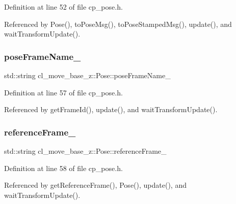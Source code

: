 Definition at line 52 of file cp\+\_\+pose.\+h.



Referenced by Pose(), to\+Pose\+Msg(), to\+Pose\+Stamped\+Msg(), update(), and wait\+Transform\+Update().

\mbox{\label{classcl__move__base__z_1_1Pose_a4f45be8e2fd73e618d815582a4ca8efe}} 
\subsubsection{\texorpdfstring{pose\+Frame\+Name\+\_\+}{poseFrameName\_}}
{\footnotesize\ttfamily std\+::string cl\+\_\+move\+\_\+base\+\_\+z\+::\+Pose\+::pose\+Frame\+Name\+\_\+\hspace{0.3cm}{\ttfamily [private]}}



Definition at line 57 of file cp\+\_\+pose.\+h.



Referenced by get\+Frame\+Id(), update(), and wait\+Transform\+Update().

\mbox{\label{classcl__move__base__z_1_1Pose_a6a7a593232b6edaf99103d48ad8da9d3}} 
\subsubsection{\texorpdfstring{reference\+Frame\+\_\+}{referenceFrame\_}}
{\footnotesize\ttfamily std\+::string cl\+\_\+move\+\_\+base\+\_\+z\+::\+Pose\+::reference\+Frame\+\_\+\hspace{0.3cm}{\ttfamily [private]}}



Definition at line 58 of file cp\+\_\+pose.\+h.



Referenced by get\+Reference\+Frame(), Pose(), update(), and wait\+Transform\+Update().

